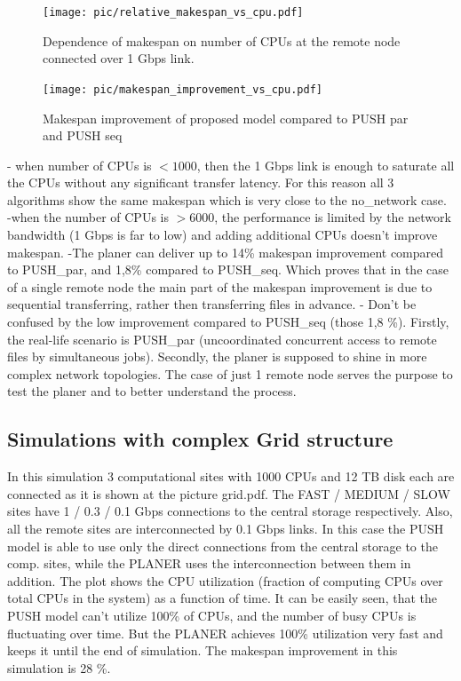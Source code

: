 \documentclass{svjour3}                     %
\begin{document}
\begin{figure}[h]
\begin{minipage}{.49\textwidth}
\centering
    \texttt{[image: pic/relative\_makespan\_vs\_cpu.pdf]}

    \caption{Dependence of makespan on number of CPUs at the remote node connected over 1 Gbps link.}
    \label{fig:simulated grig}
\end{minipage}\hspace{1pc}%
\begin{minipage}{.49\textwidth}
\centering
    \texttt{[image: pic/makespan\_improvement\_vs\_cpu.pdf]}
    \caption{Makespan improvement of proposed model compared to PUSH par and PUSH seq}
    \label{fig:path}
\end{minipage} 
\end{figure}
- when number of CPUs is $<1000$, then the 1 Gbps link is enough to saturate all the CPUs without any significant transfer latency. For this reason all 3 algorithms show the same makespan which is very close to the no\_network case.
-when the number of CPUs is $>6000$, the performance is limited by the network bandwidth (1 Gbps is far to low) and adding additional CPUs doesn't improve makespan.
-The planer can deliver up to 14\% makespan improvement compared to PUSH\_par, and 1,8\% compared to PUSH\_seq. Which proves that in the case of a single remote node the main part of the makespan improvement is due to sequential transferring, rather then transferring files in advance. 
- Don't be confused by the low improvement compared to PUSH\_seq (those 1,8 \%). Firstly, the real-life scenario is PUSH\_par (uncoordinated concurrent access to remote files by simultaneous jobs). Secondly, the planer is supposed to shine in more complex network topologies. The case of just 1 remote node serves the purpose to test the planer and to better understand the process. 




\subsection{Simulations with complex Grid structure}

In this simulation 3 computational sites with 1000 CPUs and 12 TB disk each are connected as it is shown at the picture 
grid.pdf. The FAST / MEDIUM / SLOW sites have 1 / 0.3 / 0.1 Gbps connections to the central storage respectively. Also, all the remote sites are interconnected by 0.1 Gbps links. In this case the PUSH model is able to use only the direct connections from the central storage to the comp. sites, while the PLANER uses the interconnection between them in addition. The plot shows the CPU utilization (fraction of computing CPUs over total CPUs in the system) as a function of time. It can be easily seen, that the PUSH model can't utilize 100\% of CPUs, and the number of busy CPUs is fluctuating over time. But the PLANER achieves 100\% utilization very fast and keeps it until the end of simulation. The makespan improvement in this simulation is 28 \%.
\end{document}
